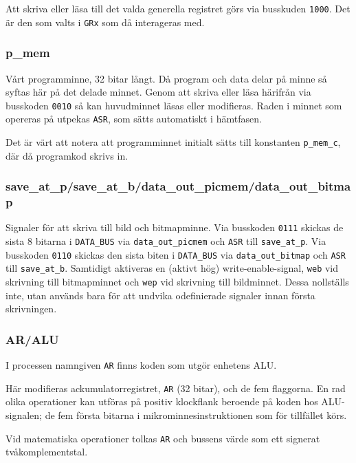 \documentclass[]{article}
\begin{document}
Att skriva eller läsa till det valda generella registret görs via busskuden \texttt{1000}. Det är den som valts i \texttt{GRx} som då interageras med. 

\subsubsection{p\_mem}

Vårt programminne, 32 bitar långt. Då program och data delar på minne så syftas här på det delade minnet. Genom att skriva eller läsa härifrån via busskoden \texttt{0010} så kan huvudminnet läsas eller modifieras. Raden i minnet som opereras på utpekas \texttt{ASR}, som sätts automatiskt i hämtfasen.

Det är värt att notera att programminnet initialt sätts till konstanten \texttt{p\_mem\_c}, där då programkod skrivs in.

\subsubsection{save\_at\_p/save\_at\_b/data\_out\_picmem/data\_out\_bitmap}

Signaler för att skriva till bild och bitmapminne. Via busskoden \texttt{0111} skickas de sista 8 bitarna i \texttt{DATA\_BUS} via \texttt{data\_out\_picmem} och \texttt{ASR} till \texttt{save\_at\_p}. Via busskoden \texttt{0110} skickas den sista biten i \texttt{DATA\_BUS} via \texttt{data\_out\_bitmap} och \texttt{ASR} till \texttt{save\_at\_b}. Samtidigt aktiveras en (aktivt hög) write-enable-signal, \texttt{web} vid skrivning till bitmapminnet och \texttt{wep} vid skrivning till bildminnet. Dessa nollställs inte, utan används bara för att undvika odefinierade signaler innan första skrivningen.

\subsubsection{AR/ALU}

I processen namngiven \texttt{AR} finns koden som utgör enhetens ALU.

Här modifieras ackumulatorregistret, \texttt{AR} (32 bitar), och de fem flaggorna. En rad olika operationer kan utföras på positiv klockflank beroende på koden hos ALU-signalen; de fem första bitarna i mikrominnesinstruktionen som för tillfället körs.

Vid matematiska operationer tolkas \texttt{AR} och bussens värde som ett signerat tvåkomplementstal.
\end{document}
